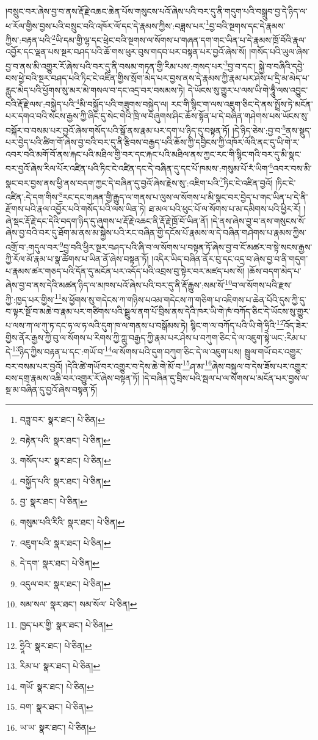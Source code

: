 །བསྲུང་བར་ཞེས་བྱ་བ་ནས་རྡོ་རྗེ་འཆང་ཆེན་པོས་གསུངས་པའོ་ཞེས་པའི་བར་དུ་ནི་གདུག་པའི་བསྒྲུབ་བྱ་དེ་ཉིད་ལ་ཕ་རོལ་གྱིས་བྱས་པའི་བསྲུང་བའི་འཁོར་ལོ་དང་དེ་རྣམས་ཀྱིས་:བཟླས་པར་\footnote{བཟླ་བར་  སྣར་ཐང་།  པེ་ཅིན། }བྱ་བའི་སྔགས་དང་དེ་རྣམས་ཀྱིས་:བརྟན་པའི་\footnote{བརྟེན་པའི་  སྣར་ཐང་།  པེ་ཅིན། }ཡི་དམ་གྱི་ལྷ་དང་ཕྲེང་བའི་སྔགས་ལ་སོགས་པ་གཞན་དག་གང་ཡིན་པ་དེ་རྣམས་ཁྲོ་བོའི་རྣལ་འབྱོར་དང་ལྡན་པས་སྔར་བཤད་པའི་ཆོ་གས་ཕུར་བུས་གདབ་པར་བསྟན་པར་བྱའོ་ཞེས་སོ། །གསོད་པའི་ཡུལ་ཞེས་བྱ་བ་ནས་མི་འགྱུར་རོ་ཞེས་པའི་བར་དུ་ནི་བསམ་གཏན་གྱི་རིམ་པས་:གསད་པར་\footnote{གསོད་པར་  སྣར་ཐང་།  པེ་ཅིན། }བྱ་བ་དང་། སྐྱེ་བ་བཞིའི་དབྱེ་བས་ཕྱེ་བའི་སྔར་བཤད་པའི་ཏིང་ངེ་འཛིན་གྱིས་སྲོག་མེད་པར་བྱས་ནས་དེ་རྣམས་ཀྱི་རྣམ་པར་ཤེས་པ་དྲི་མ་མེད་པ་རླུང་མེད་པའི་ཕྱོགས་སུ་མར་མེ་གསལ་བ་དང་འདྲ་བར་བསམས་ཏེ། དེ་ཡོངས་སུ་གྱུར་པ་ལས་ཡི་གེ་ཧཱུྃ་ལས་འབྱུང་བའི་རྡོ་རྗེ་ལས་:བསྐྱེད་པའི་\footnote{བསྐྱོད་པའི་  སྣར་ཐང་།  པེ་ཅིན། }མི་བསྐྱོད་པའི་གཟུགས་བསྐྱེད་ལ། རང་གི་སྙིང་ག་ལས་འཇུག་ཅིང་དེ་ནས་སྤྲོས་ཏེ་མངོན་པར་དགའ་བའི་སངས་རྒྱས་ཀྱི་ཞིང་དུ་སེང་གེའི་ཁྲི་ལ་བཞུགས་ཤིང་ཆོས་སྟོན་པ་དེ་བཞིན་གཤེགས་པས་ཡོངས་སུ་བསྐོར་བ་བསམ་པར་བྱའོ་ཞེས་གསོད་པའི་སྒོ་ནས་རྣམ་པར་དག་པ་ཉིད་དུ་བསྟན་ཏོ། །དེ་ཉིད་ཅེས་:བྱ་བ་\footnote{བྱ་  སྣར་ཐང་།  པེ་ཅིན། }ནས་སྡུད་པར་བྱེད་པའི་ཚིག་གོ་ཞེས་བྱ་བའི་བར་དུ་ནི་རྩིབས་བརྒྱད་པའི་ཆོས་ཀྱི་དབྱིངས་ཀྱི་འཁོར་ལོའི་ནང་དུ་ཡི་གེ་ར་འབར་བའི་མགོ་བོ་ནས་རྐང་པའི་མཐིལ་གྱི་བར་དང་རྐང་པའི་མཐིལ་ནས་ཀྱང་རང་གི་སྙིང་གའི་བར་དུ་མི་སྣང་བར་བྱའོ་ཞེས་རིལ་པོར་འཛིན་པའི་ཏིང་ངེ་འཛིན་དང་དེ་བཞིན་དུ་དང་པོ་ཁམས་:གསུམ་པོ་རཾ་ཡིག་\footnote{གསུམ་པའི་རིའི་  སྣར་ཐང་།  པེ་ཅིན། }འབར་བས་མི་སྣང་བར་བྱས་ནས་ཕྱི་ནས་བདག་ཀྱང་དེ་བཞིན་དུ་བྱའོ་ཞེས་རྗེས་སུ་:འཇིག་པའི་\footnote{འཇུག་པའི་  སྣར་ཐང་།  པེ་ཅིན། }ཏིང་ངེ་འཛིན་བྱའོ། །ཏིང་ངེ་འཛིན་:དེ་དག་གིས་\footnote{དེ་དག་  སྣར་ཐང་།  པེ་ཅིན། }རང་དང་གཞན་གྱི་རྒྱུད་ལ་གནས་པ་ལུས་ལ་སོགས་པ་མི་སྣང་བར་བྱེད་པ་གང་ཡིན་པ་དེ་ནི་རྫོགས་པའི་རྣལ་འབྱོར་པའི་གསོད་པའི་ལས་ཡིན་ཏེ། ཐ་མལ་པའི་ཕུང་པོ་ལ་སོགས་པ་མ་དམིགས་པའི་ཕྱིར་རོ། །ཞེ་སྡང་རྡོ་རྗེ་དང་དེའི་བདག་ཉིད་དུ་ཞུགས་པ་རྡོ་རྗེ་འཆང་ནི་རྡོ་རྗེ་ཁྲོ་བོ་ཡིན་ནོ། །དེ་ནས་ཞེས་བྱ་བ་ནས་གསུངས་སོ་ཞེས་བྱ་བའི་བར་དུ་ཐོག་མ་ནས་མ་སྐྱེས་པའི་རང་བཞིན་གྱི་དངོས་པོ་རྣམས་ལ་དེ་བཞིན་གཤེགས་པ་རྣམས་ཀྱིས་འགྲོ་བ་:གདུལ་བར་\footnote{འདུལ་བར་  སྣར་ཐང་།  པེ་ཅིན། }བྱ་བའི་ཕྱིར་སྔར་བཤད་པའི་ཞི་བ་ལ་སོགས་པ་བསྟན་ཏོ་ཞེས་བྱ་བ་ངོ་མཚར་བ་སྟེ་སངས་རྒྱས་ཀྱི་རོལ་མོ་རྣམ་པ་སྣ་ཚོགས་པ་ཡིན་ནོ་ཞེས་བསྟན་ཏོ། །འདིར་ཡིད་བཞིན་ནོར་བུ་དང་འདྲ་བ་ཞེས་བྱ་བ་ནི་གདུག་པ་རྣམས་ཚར་གཅད་པའི་དོན་དུ་མངོན་པར་འདོད་པའི་འབྲས་བུ་སྟེར་བར་མཛད་པས་སོ། །ཆོས་བདག་མེད་པ་ཞེས་བྱ་བ་ནས་དེའི་མཚན་ཉིད་ལ་མཁས་པའོ་ཞེས་པའི་བར་དུ་ནི་རྡོ་རྒྱུས་:སམ་སོ་\footnote{སམ་སལ་  སྣར་ཐང་། སམ་སོལ་  པེ་ཅིན། }བ་ལ་སོགས་པའི་རྫས་ཀྱི་:ཁྱད་པར་གྱིས་\footnote{ཁྱད་པར་གྱི་  སྣར་ཐང་།  པེ་ཅིན། }ས་ཕྱོགས་སུ་གདེངས་ཀ་གཉིས་པའམ་གདེངས་ཀ་གཅིག་པ་འཇིགས་པ་ཆེན་པོའི་དུས་ཀྱི་དུ་བ་ལྟར་སྔོ་བ་མཆེ་བ་རྣམ་པར་གཙིགས་པའི་སྦྲུལ་ནག་པོ་བྲིས་ནས་དེའི་ཁར་ཡི་གེ་ཁཾ་བཀོད་ཅིང་དེ་ཡོངས་སུ་གྱུར་པ་ལས་ཀ་ལ་ཀུ་ཏ་དང་ཧ་ལ་ཧ་ལའི་དུག་ཁ་ལ་གནས་པ་བསྒོམས་ཏེ། སྙིང་ག་ལ་བཀོད་པའི་ཡི་གེ་ཧྲིའི་\footnote{ཧྲཱིའི་  སྣར་ཐང་།  པེ་ཅིན། }འོད་ཟེར་གྱིས་ནོར་རྒྱས་ཀྱི་བུ་ལ་སོགས་པ་རིགས་ཀྱི་ཀླུ་བརྒྱད་ཀྱི་རྣམ་པར་ཤེས་པ་བཀུག་ཅིང་དེ་ལ་འཇུག་སྟེ་ཡང་:རིམ་པ་དེ་\footnote{རིམ་པ་  སྣར་ཐང་།  པེ་ཅིན། }ཉིད་ཀྱིས་བརྟན་པ་དང་:གཡོ་བ་\footnote{གཡོ་  སྣར་ཐང་།  པེ་ཅིན། }ལ་སོགས་པའི་དུག་བཀུག་ཅིང་དེ་ལ་འཇུག་པས། སྦྲུལ་གཡོ་བར་འགྱུར་བར་བསམ་པར་བྱའོ། །དེའི་ཚེ་གཡོ་བར་འགྱུར་བ་དེས་ཆེ་གེ་མོ་བ་\footnote{བག་  སྣར་ཐང་།  པེ་ཅིན། }ཤ་མ་\footnote{ཡ་ཡ་  སྣར་ཐང་།  པེ་ཅིན། }ཞེས་བསྐུལ་བ་དེས་ཟོས་པར་འགྱུར་བས་དགྲ་རྣམས་འཆི་བར་འགྱུར་རོ་ཞེས་བསྟན་ཏོ། །དེ་བཞིན་དུ་བྲིས་པའི་སྦལ་པ་ལ་སོགས་པ་མངོན་པར་བྱས་ལ་སྔ་མ་བཞིན་དུ་བྱའོ་ཞེས་བསྟན་ཏོ། 